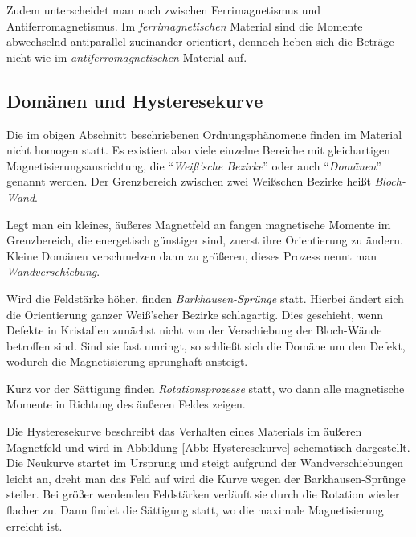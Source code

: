 \documentclass[12pt,a4paper]{scrartcl}
\numberwithin{equation}{section} %
\renewcommand{\[}{} %
\renewcommand{\]}{\noindent} %
\begin{document}
Zudem unterscheidet man noch zwischen Ferrimagnetismus und Antiferromagnetismus. Im \emph{ferrimagnetischen} Material sind die Momente abwechselnd antiparallel zueinander orientiert, dennoch heben sich die Beträge nicht wie im \emph{antiferromagnetischen} Material auf.

\hypertarget{domuxe4nen-und-hysteresekurve}{%
\subsection{Domänen und Hysteresekurve}\label{domuxe4nen-und-hysteresekurve}}
Die im obigen Abschnitt beschriebenen Ordnungsphänomene finden im Material nicht homogen statt. Es existiert also viele einzelne Bereiche mit gleichartigen Magnetisierungsausrichtung, die ``\emph{Weiß'sche Bezirke}'' oder auch ``\emph{Domänen}'' genannt werden. Der Grenzbereich zwischen zwei Weißschen Bezirke heißt \emph{Bloch-Wand}.

Legt man ein kleines, äußeres Magnetfeld an fangen magnetische Momente im Grenzbereich, die energetisch günstiger sind, zuerst ihre Orientierung zu ändern. Kleine Domänen verschmelzen dann zu größeren, dieses Prozess nennt man \emph{Wandverschiebung}.

Wird die Feldstärke höher, finden \emph{Barkhausen-Sprünge} statt. Hierbei ändert sich die Orientierung ganzer Weiß'scher Bezirke schlagartig. Dies geschieht, wenn Defekte in Kristallen zunächst nicht von der Verschiebung der Bloch-Wände betroffen sind. Sind sie fast umringt, so schließt sich die Domäne um den Defekt, wodurch die Magnetisierung sprunghaft ansteigt.

Kurz vor der Sättigung finden \emph{Rotationsprozesse} statt, wo dann alle magnetische Momente in Richtung des äußeren Feldes zeigen.

Die Hysteresekurve beschreibt das Verhalten eines Materials im äußeren Magnetfeld und wird in Abbildung \ref{Abb: Hysteresekurve} schematisch dargestellt. Die Neukurve startet im Ursprung und steigt aufgrund der Wandverschiebungen leicht an, dreht man das Feld auf wird die Kurve wegen der Barkhausen-Sprünge steiler. Bei größer werdenden Feldstärken verläuft sie durch die Rotation wieder flacher zu. Dann findet die Sättigung statt, wo die maximale Magnetisierung erreicht ist.
\end{document}
